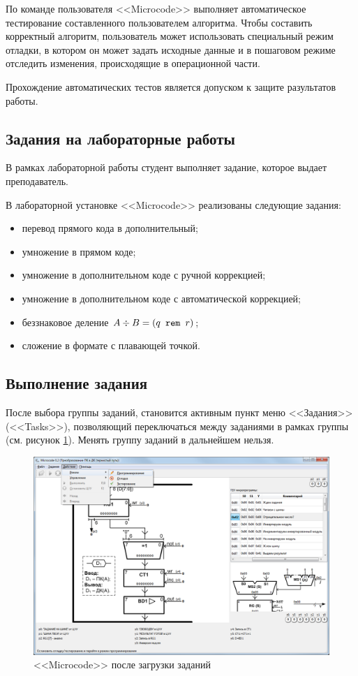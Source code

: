 По команде пользователя <<Microcode>> выполняет автоматическое тестирование составленного пользователем алгоритма. Чтобы составить корректный алгоритм, пользователь может использовать специальный режим отладки, в котором он может задать исходные данные и в пошаговом режиме отследить изменения, происходящие в операционной части.

Прохождение автоматических тестов является допуском к защите разультатов работы.


\subsection{Задания на лабораторные работы}

В рамках лабораторной работы студент выполняет задание, которое выдает преподаватель.

В лабораторной установке <<Microcode>> реализованы следующие задания: 
\begin{itemize}
    \item перевод прямого кода в дополнительный;
    \item умножение в прямом коде;
    \item умножение в дополнительном коде с ручной коррекцией;
    \item умножение в дополнительном коде с автоматической коррекцией;
    \item беззнаковое деление $A\div B = (\texttt{$q$ rem $r$})$;
    \item сложение в формате с плавающей точкой.
\end{itemize}


\subsection{Выполнение задания}

После выбора группы заданий, становится активным пункт меню <<Задания>>(<<Tasks>>), позволяющий переключаться между заданиями в рамках группы (см. рисунок \ref{fig:mic:MicTaskWindow}). Менять группу заданий в дальнейшем нельзя.

\begin{figure}
    \centering
    \includegraphics[width=\textwidth]{fig/MicTaskWindow}
    \caption{<<Microcode>> после загрузки заданий}\label{fig:mic:MicTaskWindow}
\end{figure}

